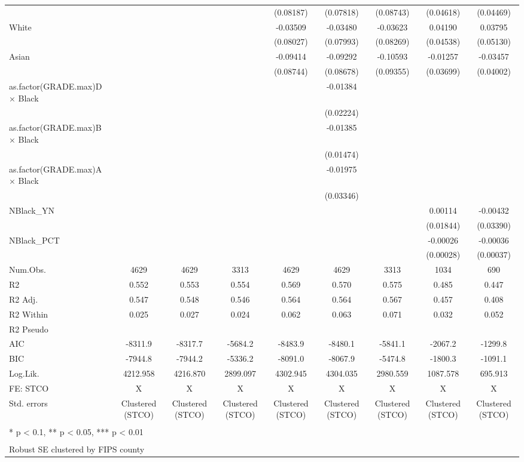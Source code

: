 \documentclass[
]{article}
\begin{document}
\begin{table}
{\begin{tabular}[t]{lcccccccc}
 &  &  &  & (0.08187) & (0.07818) & (0.08743) & (0.04618) & (0.04469)\\
White &  &  &  & -0.03509 & -0.03480 & -0.03623 & 0.04190 & 0.03795\\
 &  &  &  & (0.08027) & (0.07993) & (0.08269) & (0.04538) & (0.05130)\\
Asian &  &  &  & -0.09414 & -0.09292 & -0.10593 & -0.01257 & -0.03457\\
 &  &  &  & (0.08744) & (0.08678) & (0.09355) & (0.03699) & (0.04002)\\
as.factor(GRADE.max)D × Black &  &  &  &  & -0.01384 &  &  & \\
 &  &  &  &  & (0.02224) &  &  & \\
as.factor(GRADE.max)B × Black &  &  &  &  & -0.01385 &  &  & \\
 &  &  &  &  & (0.01474) &  &  & \\
as.factor(GRADE.max)A × Black &  &  &  &  & -0.01975 &  &  & \\
 &  &  &  &  & (0.03346) &  &  & \\
NBlack\_YN &  &  &  &  &  &  & 0.00114 & -0.00432\\
 &  &  &  &  &  &  & (0.01844) & (0.03390)\\
NBlack\_PCT &  &  &  &  &  &  & -0.00026 & -0.00036\\
 &  &  &  &  &  &  & (0.00028) & (0.00037)\\
\midrule
Num.Obs. & 4629 & 4629 & 3313 & 4629 & 4629 & 3313 & 1034 & 690\\
R2 & 0.552 & 0.553 & 0.554 & 0.569 & 0.570 & 0.575 & 0.485 & 0.447\\
R2 Adj. & 0.547 & 0.548 & 0.546 & 0.564 & 0.564 & 0.567 & 0.457 & 0.408\\
R2 Within & 0.025 & 0.027 & 0.024 & 0.062 & 0.063 & 0.071 & 0.032 & 0.052\\
R2 Pseudo &  &  &  &  &  &  &  & \\
AIC & -8311.9 & -8317.7 & -5684.2 & -8483.9 & -8480.1 & -5841.1 & -2067.2 & -1299.8\\
BIC & -7944.8 & -7944.2 & -5336.2 & -8091.0 & -8067.9 & -5474.8 & -1800.3 & -1091.1\\
Log.Lik. & 4212.958 & 4216.870 & 2899.097 & 4302.945 & 4304.035 & 2980.559 & 1087.578 & 695.913\\
FE: STCO & X & X & X & X & X & X & X & X\\
Std. errors & Clustered (STCO) & Clustered (STCO) & Clustered (STCO) & Clustered (STCO) & Clustered (STCO) & Clustered (STCO) & Clustered (STCO) & Clustered (STCO)\\
\bottomrule
\multicolumn{9}{l}{\textsuperscript{} * p < 0.1, ** p < 0.05, *** p < 0.01}\\
\multicolumn{9}{l}{\textsuperscript{} Robust SE clustered by FIPS county}\\
\end{tabular}}
\end{table}
\end{document}
